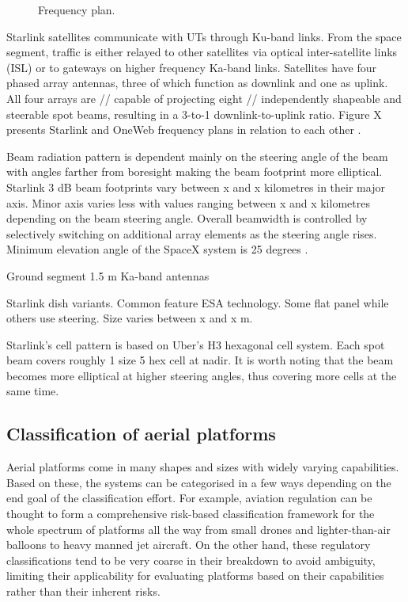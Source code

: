 \documentclass[english, 12pt, a4paper, elec, utf8, a-1b, online]{aaltothesis}
\begin{document}
\begin{figure}[h]
  \centering
  
  \caption{Frequency plan.}
  \label{fig-f-plan}
\end{figure}

Starlink satellites communicate with UTs through Ku-band links.
From the space segment, traffic is either relayed to other satellites via optical inter-satellite links (ISL) or to gateways on higher frequency Ka-band links.
Satellites have four phased array antennas, three of which function as downlink and one as uplink.
All four arrays are // capable of projecting eight // independently shapeable and steerable spot beams, resulting in a 3-to-1 downlink-to-uplink ratio.
Figure X presents Starlink and OneWeb frequency plans in relation to each other \cite{spacex2016loa}. %

Beam radiation pattern is dependent mainly on the steering angle of the beam with angles farther from boresight making the beam footprint more elliptical.
Starlink 3 dB beam footprints vary between x and x kilometres in their major axis.
Minor axis varies less with values ranging between x and x kilometres depending on the beam steering angle. %
Overall beamwidth is controlled by selectively switching on additional array elements as the steering angle rises.
Minimum elevation angle of the SpaceX system is 25 degrees \cite{spacex2016loa, spacex2020mod}.

Ground segment 1.5 m Ka-band antennas %

Starlink dish variants. Common feature ESA technology. Some flat panel while others use steering. Size varies between x and x m.

Starlink's cell pattern is based on Uber's H3 hexagonal cell system. Each spot beam covers roughly 1 size 5 hex cell at nadir. It is worth noting that the beam becomes more elliptical at higher steering angles, thus covering more cells at the same time.

\subsection{Classification of aerial platforms} \label{ch-aerial-platforms}

Aerial platforms come in many shapes and sizes with widely varying capabilities.
Based on these, the systems can be categorised in a few ways depending on the end goal of the classification effort.
For example, aviation regulation can be thought to form a comprehensive risk-based classification framework for the whole spectrum of platforms all the way from small drones and lighter-than-air balloons to heavy manned jet aircraft.
On the other hand, these regulatory classifications tend to be very coarse in their breakdown to avoid ambiguity, limiting their applicability for evaluating platforms based on their capabilities rather than their inherent risks.
\end{document}
